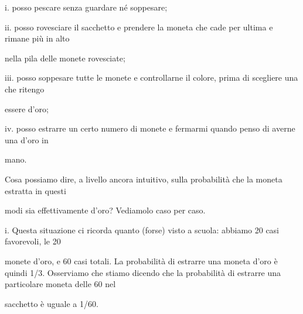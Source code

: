 \documentclass[a4paper,portrait,12pt]{article}
\begin{document}
\begin{flushleft}
i. posso pescare senza guardare n\'{e} soppesare;
\end{flushleft}


\begin{flushleft}
ii. posso rovesciare il sacchetto e prendere la moneta che cade per ultima e rimane più in alto
\end{flushleft}


\begin{flushleft}
nella pila delle monete rovesciate;
\end{flushleft}


\begin{flushleft}
iii. posso soppesare tutte le monete e controllarne il colore, prima di scegliere una che ritengo
\end{flushleft}


\begin{flushleft}
essere d'oro;
\end{flushleft}


\begin{flushleft}
iv. posso estrarre un certo numero di monete e fermarmi quando penso di averne una d'oro in
\end{flushleft}


\begin{flushleft}
mano.
\end{flushleft}


\begin{flushleft}
Cosa possiamo dire, a livello ancora intuitivo, sulla probabilit\`{a} che la moneta estratta in questi
\end{flushleft}


\begin{flushleft}
modi sia effettivamente d'oro? Vediamolo caso per caso.
\end{flushleft}


\begin{flushleft}
i. Questa situazione ci ricorda quanto (forse) visto a scuola: abbiamo 20 casi favorevoli, le 20
\end{flushleft}


\begin{flushleft}
monete d'oro, e 60 casi totali. La probabilit\`{a} di estrarre una moneta d'oro \`{e} quindi 1/3. Osserviamo che stiamo dicendo che la probabilit\`{a} di estrarre una particolare moneta delle 60 nel
\end{flushleft}


\begin{flushleft}
sacchetto \`{e} uguale a 1/60.
\end{flushleft}
\end{document}
